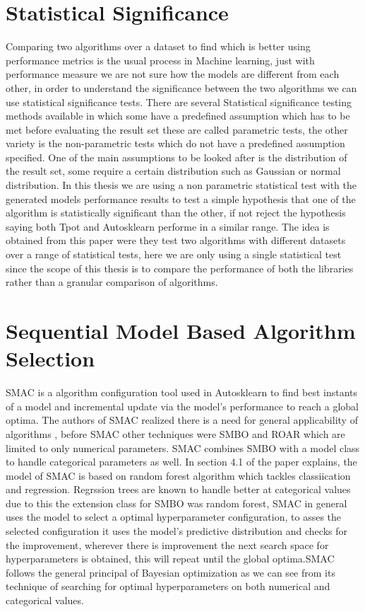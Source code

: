 \section{Statistical Significance}
Comparing two algorithms over a dataset to find which is better using performance metrics is the usual process in Machine learning, just with performance measure we are not sure how the models are different from each other, in order to understand the significance between the two algorithms we can use statistical significance tests. There are several Statistical significance testing methods available in which some have a predefined assumption which has to be met before evaluating the result set these are called parametric tests, the other variety is the non-parametric tests which do not have a predefined assumption specified. One of the main assumptions to be looked after is the distribution of the result set, some require a certain distribution such as Gaussian or normal distribution. In this thesis we are using a non parametric statistical test with the generated models performance results to test a simple hypothesis that one of the algorithm is statistically significant than the other, if not reject the hypothesis saying both Tpot and Autosklearn performe in a similar range. The idea is obtained from this paper\cite{statistical} were they test two algorithms with different datasets over a range of statistical tests, here we are only using a single statistical test since the scope of this thesis is to compare the performance of both the libraries rather than a granular comparison of algorithms.

\section{Sequential Model Based Algorithm Selection}
SMAC\cite{HutHooLey11-smac} is a algorithm configuration tool used in Autosklearn to find best instants of a model and incremental update via the model's performance to reach a global optima. The authors of SMAC realized there is a need for general applicability of algorithms , before SMAC other techniques were SMBO and ROAR which are limited to only numerical  parameters. SMAC combines SMBO with a model class to handle categorical parameters as well. In section 4.1 of the paper\cite{HutHooLey11-smac} explains, the model of SMAC is based on random forest algorithm which tackles classiication and regression. Regrssion trees are known to handle better at categorical values due to this the extension class for SMBO was random forest, SMAC in general uses the model to select a optimal hyperparameter configuration, to asses the selected configuration it uses the model's predictive distribution and checks for the improvement, wherever there is improvement the next search space for hyperparameters is obtained, this will repeat until the global optima.SMAC follows the general principal of Bayesian optimization as we can see from its technique of searching for optimal hyperparameters on both numerical and categorical values. 
